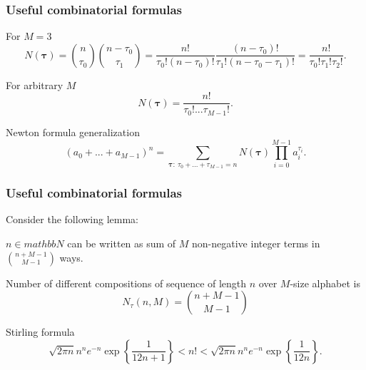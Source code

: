 \documentclass[14pt]{beamer}
\renewcommand{\vec}[1]{\ensuremath{\boldsymbol{#1}}}
\begin{document}
\begin{frame}
\frametitle{Useful combinatorial formulas}
\begin{itemize}    
\small{ 
    
    \item For $M=3$
    \[
    N(\vec \tau) = \binom  n {\tau _0 } \binom {n - \tau _0 } {\tau _1 } = \frac{n!}{\tau _0 !(n - \tau _0 )!}\frac{(n - \tau _0 )!}{\tau _1 !(n - \tau _0 - \tau _1 )!} = \frac{n!}{\tau _0 !\tau _1 !\tau _2 !}.
    \]
    
    \item For arbitrary $M$
    \begin{equation}
    \label{eq3_7} N(\vec \tau) = \frac{n!}{\tau _0 !...\tau _{M - 1} !}.
    \end{equation}
    
    \item Newton formula generalization
    \[
    (a_0 + ... + a_{M - 1} )^n = \sum\limits_{\vec \tau:~\tau _0 + ... + \tau _{M - 1} = n} {N(\vec \tau)\prod\limits_{i = 0}^{M - 1} {a_i^{\tau _i } } } .
    \]
}
\end{itemize}
\end{frame}


\begin{frame}
\frametitle{Useful combinatorial formulas}
\begin{itemize}    
\small{
    
    \item Consider the following lemma:
    \begin{lemma} \label{num_comp} $n \in mathbb{N}$ can be written as sum of $M$ non-negative integer terms in $\binom  {n + M - 1} {M - 1} $ ways. 
    \end{lemma}

    \item Number of different compositions of sequence of length $n$ over $M$-size alphabet is
    \begin{equation}
    \label{eq3_8}
    N_\tau (n,M) = \binom {n + M - 1} {M - 1}
    \end{equation}
    
    \item Stirling formula
    \begin{equation}
    \label{eq3_9} \sqrt {2\pi n} n^ne^{ - n}\exp \left\{ {\frac{1}{12n + 1}} \right\} < n! < \sqrt {2\pi n} n^ne^{ - n}\exp \left\{ {\frac{1}{12n}} \right\}.
    \end{equation}  
 }   
\end{itemize}
\end{frame}
\end{document}
